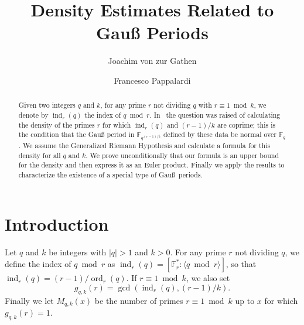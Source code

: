 \documentclass[twoside,final,reqno,noamsfonts]{birkartspecial}
\begin{document}
\volinfo
\setcounter{page}{33}

\title[Density Estimates Related to {Gau\ss} Periods]
{Density Estimates Related to\\ {Gau\ss} Periods}
\author[J.~von zur Gathen]{Joachim von zur Gathen}
\address{Fachbereich Mathematik-Informatik, Universit\"at Paderborn\br
D--33095 Paderborn,  Germany\br E-mail: {gathen@upb.de}}

\author[F.~Pappalardi]{Francesco Pappalardi}
\address{Dipartimento di Matematica, Universit\`{a} Roma Tre\br Largo S. L.
Murialdo, 1\br I--00146, Roma,  Italy\br E-mail:
{pappa@mat.uniroma3.it}}

\begin{abstract}
Given two integers $q$ and $k$, for any prime $r$ not dividing $q$ with
$r\equiv1\bmod k$, we denote by $\operatorname{ind}_r(q)$ the index of $q \bmod r$.
In~\cite{gaogat95} the question was raised
of calculating the density of the primes $r$ for which
$\operatorname{ind}_r(q)$ and $(r-1)/k$ are coprime; this is the
condition that the Gau{\ss} period in
${\mathbb F}_{{q}^{(r-1)/k}}$ defined by these data be normal over ${\mathbb F}_{q}$.
We assume the Generalized Riemann Hypothesis and calculate a formula
for this  density for
all $q$ and
$k$. We prove unconditionally that our formula  is an upper bound for the density and
then express it as an Euler product. Finally we apply the results to characterize the
existence of a special type of Gau\ss\ periods.
\end{abstract}

\maketitle

\section{Introduction}
Let $q$ and $k$ be integers with $| q | >1$ and $k>0$.
 For any prime $r$ not dividing
$q$, we define the index of $q\bmod r$ as $
\operatorname{ind}_r(q)=
[{\mathbb F}_r^*:\langle q\bmod r \rangle]$,
so that  $\operatorname{ind}_r(q)= (r-1)/\operatorname{ord}_{r}(q)$. If
$r\equiv 1\bmod k$, we also set
$$g_{q,k}(r)=\gcd
\left(\operatorname{ind}_r(q),(r-1)/ k\right).$$
Finally we let $M_{q,k}(x)$  be the
number of primes $r \equiv 1 \bmod k$
up to $x$ for which $g_{q,k}(r)=1$.
\end{document}

